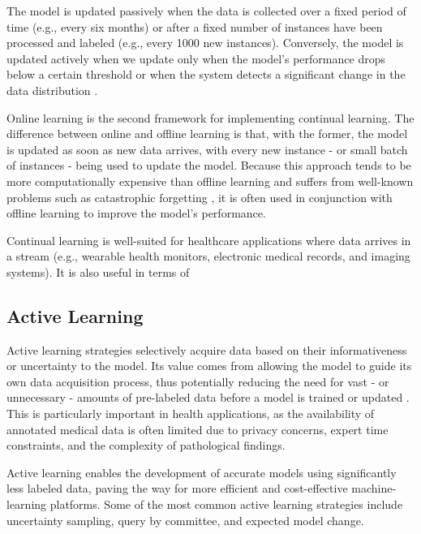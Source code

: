 \documentclass[../main.tex]{subfiles}
\begin{document}
     The model is updated passively when the data is collected over a fixed period of time (e.g., every six months) or after a fixed number of instances have been processed and labeled (e.g., every 1000 new instances). Conversely, the model is updated actively when we update only when the model's performance drops below a certain threshold or when the system detects a significant change in the data distribution \cite{huyen_designing_2022}.

    Online learning is the second framework for implementing continual learning. The difference between online and offline learning is that, with the former, the model is updated as soon as new data arrives, with every new instance - or small batch of instances - being used to update the model. Because this approach tends to be more computationally expensive than offline learning and suffers from well-known problems such as catastrophic forgetting \cite{huyen_designing_2022}, it is often used in conjunction with offline learning to improve the model's performance. 

    Continual learning is well-suited for healthcare applications where data arrives in a stream (e.g., wearable health monitors, electronic medical records, and imaging systems). It is also useful in terms of 



	
    \subsection{Active Learning} \label{sec:active_learning}
 
     Active learning strategies selectively acquire data based on their informativeness or uncertainty to the model. Its value comes from allowing the model to guide its own data acquisition process, thus potentially reducing the need for vast - or unnecessary - amounts of pre-labeled data before a model is trained or updated \cite{huyen_designing_2022, chen_study_2015, figueroa_predicting_2012}. 
     This is particularly important in health applications, as the availability of annotated medical data is often limited due to privacy concerns, expert time constraints, and the complexity of pathological findings.
     
     Active learning enables the development of accurate models using significantly less labeled data, paving the way for more efficient and cost-effective machine-learning platforms. Some of the most common active learning strategies include uncertainty sampling, query by committee, and expected model change. 
\end{document}
